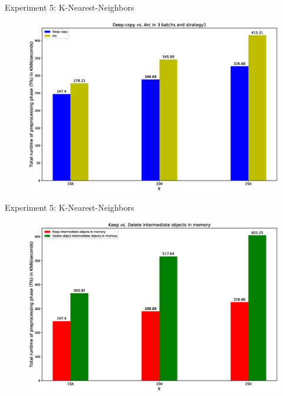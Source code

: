 \documentclass[9pt]{beamer}
\begin{document}
\begin{frame}[fragile]{Experiment 5: K-Nearest-Neighbors}
    \vspace{-0.7cm}
    \begin{figure}[hp]
        \centering
        \begin{center}
                \includegraphics[width=1.1\textwidth]{images/deepcopy_vs_arc.eps}
                \captionsetup{labelformat=empty}
        \end{center}
    \end{figure}
    
\end{frame}


\begin{frame}[fragile]{Experiment 5: K-Nearest-Neighbors}
    \vspace{-0.7cm}
    \begin{figure}[hp]
        \centering
        \begin{center}
                \includegraphics[width=1.1\textwidth]{images/strategy1_vs_strategy2.eps}
                \captionsetup{labelformat=empty}
        \end{center}
    \end{figure}
    
\end{frame}
\end{document}
